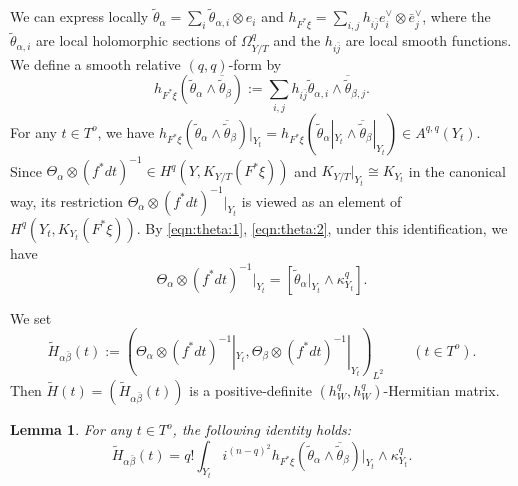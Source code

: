 \documentclass[amscd, leqno]{amsart}
\theoremstyle{plain}
\newtheorem{lemma}[theorem]{Lemma}
\theoremstyle{definition}
\theoremstyle{remark}
\begin{document}
We can express locally $\widetilde{\theta}_{\alpha}=\sum_{i} \widetilde{\theta}_{\alpha,i}\otimes e_{i}$ and 
$h_{F^{*}\xi}=\sum_{i,j}h_{i\bar{j}}e_{i}^{\lor}\otimes\bar{e}_{j}^{\lor}$,
where the $\widetilde{\theta}_{\alpha,i}$ are local holomorphic sections of $\Omega_{Y/T}^{q}$ and 
the $h_{i\bar{j}}$ are local smooth functions. We define a smooth relative $(q,q)$-form by
$$
h_{F^{*}\xi}(\widetilde{\theta}_{\alpha}\wedge\overline{\widetilde{\theta}}_{\beta})
:=
\sum_{i,j}h_{i\bar{j}} \widetilde{\theta}_{\alpha,i}\wedge\overline{\widetilde{\theta}}_{\beta,j}.
$$
For any $t\in T^{o}$, we have
$h_{F^{*}\xi}(\widetilde{\theta}_{\alpha}\wedge\overline{\widetilde{\theta}}_{\beta})|_{Y_{t}} = 
h_{F^{*}\xi}(\widetilde{\theta}_{\alpha}|_{Y_{t}}\wedge\overline{{\widetilde{\theta}}}_{\beta}|_{Y_{t}}) 
\in A^{q,q}(Y_{t})$.
Since $\Theta_{\alpha} \otimes (f^{*}dt)^{-1} \in H^{q}(Y, K_{Y/T}(F^{*}\xi))$ and $K_{Y/T}|_{Y_{t}} \cong K_{Y_{t}}$ in the canonical way, 
its restriction $\Theta_{\alpha} \otimes (f^{*}dt)^{-1}|_{Y_{t}}$ is viewed as an element of $H^{q}(Y_{t}, K_{Y_{t}}(F^{*}\xi))$. 
By \eqref{eqn:theta:1}, \eqref{eqn:theta:2}, under this identification, we have
$$
\Theta_{\alpha} \otimes (f^{*}dt)^{-1}|_{Y_{t}} = [ \widetilde{\theta}_{\alpha}|_{Y_{t}} \wedge \kappa_{Y_{t}}^{q} ].
$$
\par
We set
\begin{equation}
\label{eqn:L2:met:f}
\widetilde{H}_{\alpha\bar{\beta}}(t) 
:= \left( \Theta_{\alpha}\otimes(f^{*}dt)^{-1}|_{Y_{t}},\Theta_{\beta}\otimes(f^{*}dt)^{-1}|_{Y_{t}} \right)_{L^{2}}
\qquad(t\in T^{o}).
\end{equation}
Then $\widetilde{H}(t)=( \widetilde{H}_{\alpha\bar{\beta}}(t) )$ is a positive-definite $(h_{W}^{q}, h_{W}^{q})$-Hermitian matrix.


\begin{lemma}
\label{lemma:fiber:integral}
For any $t\in T^{o}$, the following identity holds:
$$
\widetilde{H}_{\alpha\bar{\beta}}(t)
=
q! \int_{Y_{t}} i^{(n-q)^{2}} h_{F^{*}\xi}(\widetilde{\theta}_{\alpha}\wedge\overline{\widetilde{\theta}}_{\beta})|_{Y_{t}}
\wedge\kappa_{Y_{t}}^{q}.
$$
\end{lemma}
\end{document}
